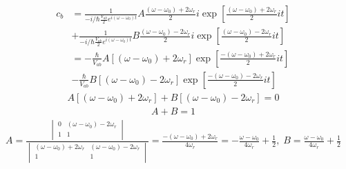 \begin{enumerate}
\begin{align*}
              c_b & = \frac{1}{-i/\hbar \frac{V_{ab}}{2}e^{i(\omega-\omega_0)t}}
              A
              \frac{(\omega-\omega_0) + 2\omega_r}{2} i
              \exp\left[
                      \frac{(\omega-\omega_0) + 2\omega_r}{2} it
                      \right] \\
                  & + \frac{1}{-i/\hbar \frac{V_{ab}}{2}e^{i(\omega-\omega_0)t}}B\frac{(\omega-\omega_0) - 2\omega_r}{2} i
              \exp\left[
                      \frac{(\omega-\omega_0) - 2\omega_r}{2} it
                      \right] \\
                  & =
              -\frac{\hbar }{V_{ab}}
              A
                  [(\omega-\omega_0) + 2\omega_r]
              \exp\left[
                      \frac{-(\omega-\omega_0) + 2\omega_r}{2} it
                      \right] \\
                  & - \frac{\hbar}{ V_{ab}}
              B
                  [(\omega-\omega_0) - 2\omega_r]
              \exp\left[
                      \frac{-(\omega-\omega_0) - 2\omega_r}{2} it
                      \right]
          \end{align*}
          \begin{align*}
              A
                  [(\omega-\omega_0) + 2\omega_r]
              + B[(\omega-\omega_0) - 2\omega_r] = 0
          \end{align*}
          \begin{align*}
              A+B=1
          \end{align*}
          \begin{align*}
              A = \frac{\begin{vmatrix}
                          0 & (\omega-\omega_0) - 2\omega_r \\
                          1 & 1                             \\
                      \end{vmatrix}}{\begin{vmatrix}
                          (\omega-\omega_0) + 2\omega_r & (\omega-\omega_0) - 2\omega_r \\
                          1                             & 1                             \\
                      \end{vmatrix}} =
              \frac{
                  -(\omega-\omega_0) + 2\omega_r
              }{4\omega_r} = -\frac{\omega-\omega_0}{4\omega_r} + \frac{1}{2}, \;
              B= \frac{\omega-\omega_0}{4\omega_r} + \frac{1}{2}

\end{align*}
\end{enumerate}
